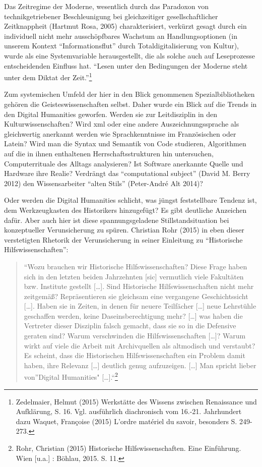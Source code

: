 \documentclass[a4paper,
fontsize=11pt,
oneside,
numbers=noperiodatend,
parskip=half-,
bibliography=totoc,
final
]{scrartcl}
\begin{document}
Das Zeitregime der Moderne, wesentlich durch das Paradoxon von
technikgetriebener Beschleunigung bei gleichzeitiger gesellschaftlicher
Zeitknappheit (Hartmut Rosa, 2005) charakterisiert, verkürzt gesagt
durch ein individuell nicht mehr ausschöpfbares Wachstum an
Handlungsoptionen (in unserem Kontext \enquote{Informationsflut} durch
Totaldigitalisierung von Kultur), wurde als eine Systemvariable
herausgestellt, die als solche auch auf Leseprozesse entscheidenden
Einfluss hat. \enquote{Lesen unter den Bedingungen der Moderne steht
unter dem Diktat der Zeit.}\footnote{Zedelmaier, Helmut (2015)
  Werkstätte des Wissens zwischen Renaissance und Aufklärung, S. 16.
  Vgl. ausführlich diachronisch vom 16.-21. Jahrhundert dazu Waquet,
  Françoise (2015) L'ordre matériel du savoir, besonders S. 249-273.}

Zum systemischen Umfeld der hier in den Blick genommenen
Spezialbibliotheken gehören die Geisteswissenschaften selbst. Daher
wurde ein Blick auf die Trends in den Digital Humanities geworfen.
Werden sie zur Leitdisziplin in den Kulturwissenschaften? Wird xml oder
eine andere Auszeichnungssprache als gleichwertig anerkannt werden wie
Sprachkenntnisse im Französischen oder Latein? Wird man die Syntax und
Semantik von Code studieren, Algorithmen auf die in ihnen enthaltenen
Herrschaftsstrukturen hin untersuchen, Computerrituale des Alltags
analysieren? Ist Software anerkannte Quelle und Hardware ihre Realie?
Verdrängt das \enquote{computational subject} (David M. Berry 2012) den
Wissensarbeiter \enquote{alten Stils} (Peter-André Alt 2014)?

Oder werden die Digital Humanities schlicht, was jüngst feststellbare
Tendenz ist, dem Werkzeugkasten des Historikers hinzugefügt? Es gibt
deutliche Anzeichen dafür. Aber auch hier ist diese spannungsgeladene
Stillstandsituation bei konzeptueller Verunsicherung zu spüren.
Christian Rohr (2015) in eben dieser verstetigten Rhetorik der
Verunsicherung in seiner Einleitung zu \enquote{Historische
Hilfswissenschaften}:

\begin{quote}
\enquote{Wozu brauchen wir Historische Hilfswissenschaften? Diese Frage
haben sich in den letzten beiden Jahrzehnten {[}sic{]} vermutlich viele
Fakultäten bzw. Institute gestellt {[}\ldots{}{]}. Sind Historische
Hilfswissenschaften nicht mehr zeitgemäß? Repräsentieren sie gleichsam
eine vergangene Geschichtssicht {[}\ldots{}{]}. Haben sie in Zeiten, in
denen für neuere Teilfächer {[}\ldots{}{]} neue Lehrstühle geschaffen
werden, keine Daseinsberechtigung mehr? {[}\ldots{}{]} was haben die
Vertreter dieser Disziplin falsch gemacht, dass sie so in die Defensive
geraten sind? Warum verschwinden die Hilfswissenschaften {[}\ldots{}{]}?
Warum wirkt auf viele die Arbeit mit Archivquellen als altmodisch und
verstaubt? Es scheint, dass die Historischen Hilfswissenschaften ein
Problem damit haben, ihre Relevanz {[}\ldots{}{]} deutlich genug
aufzuzeigen. {[}\ldots{}{]} Man spricht lieber von}Digital Humanities"
{[}\ldots{}{]}.``\footnote{Rohr, Christian (2015) Historische
  Hilfswissenschaften. Eine Einführung. Wien {[}u.a.{]} : Böhlau, 2015.
  S. 11.}
\end{quote}
\end{document}
